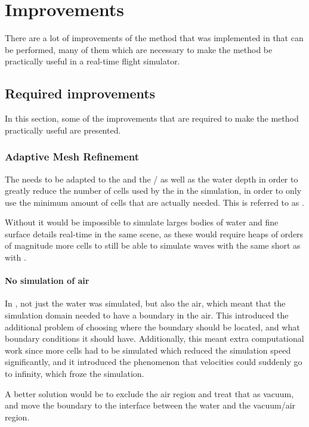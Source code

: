 \chapter{Improvements}

There are a lot of improvements of the method that was implemented in \thisprojectwork that can be performed, many of them which are necessary  to make the method be practically useful in a real-time flight simulator.

\section{Required improvements}

In this section, some of the improvements that are required to make the method practically useful are presented.

\subsection{Adaptive Mesh Refinement}

The \LOD needs to be adapted to the  and the \FOV/ as well as the water depth in order to greatly reduce the number of cells used by the \FVM in the simulation, in order to only use the minimum amount of cells that are actually needed. This is referred to as \AMR.

Without \AMR it would be impossible to simulate larges bodies of water and fine surface details real-time in the same scene, as these would require heaps of orders of magnitude more cells to still be able to simulate waves with the same short \wavelength as with \AMR.

\subsubsection{No simulation of air} In \thisprojectwork, not just the water was simulated, but also the air, which meant that the simulation domain needed to have a boundary in the air. This introduced the additional problem of choosing where the boundary should be located, and what boundary conditions it should have. Additionally, this meant extra computational work since more cells had to be simulated which reduced the simulation speed significantly, and it introduced the phenomenon that velocities could suddenly go to infinity, which froze the simulation.

A better solution would be to exclude the air region and treat that as vacuum, and move the boundary to the interface between the water and the vacuum/air region.

